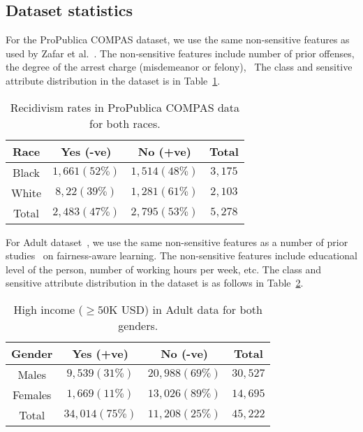\documentclass{article}
\begin{document}
\begin{appendix}
\section{Dataset statistics} \label{app:data}



For the ProPublica COMPAS dataset, we use the same non-sensitive features as used by Zafar et al.~\cite{zafar_dmt}. The non-sensitive features include number of prior offenses, the degree of the arrest charge (misdemeanor or felony), \etc~The class and sensitive attribute distribution in the dataset is  in Table~\ref{table:compas-stats}.

\begin{table}[h]
\centering
\caption{Recidivism rates in ProPublica COMPAS data for both races.} \label{table:compas-stats}
\begin{tabular}{cccc}
\hline
Race  &  Yes (-ve)       & No (+ve)       & Total \\ \hline
Black &  $ 1,661 (52\%)  $ & $ 1,514 (48\%)$ &  $ 3,175$ \\
White &  $ 8,22  (39\%) $  & $1,281  (61\%)$ &  $ 2,103$ \\ \hline
Total &  $ 2,483 (47\%) $  & $2,795  (53\%)$ &  $ 5,278$ \\ \hline
\end{tabular}
\end{table}



For Adult dataset~\cite{adult_dataset}, we use the same non-sensitive features as a number of prior studies~\cite{feldman_kdd15,zafar_fairness,icml2013_zemel13} on fairness-aware  learning. The non-sensitive features include educational level of the person, number of working hours per week, etc.
The class and sensitive attribute distribution in the dataset is as follows in Table~\ref{table:adult-stats}.

\begin{table}[h]
\centering
\caption{High income ($\geq 50$K USD) in Adult data for both genders.} \label{table:adult-stats}
\begin{tabular}{cccc}
\hline
Gender  & Yes (+ve) & No (-ve) & Total \\ \hline
Males &  $ 9{,}539 (31\%)$&  $ 20{,}988 (69\%)$   &  $ 30{,}527$\\
Females & $1{,}669 (11\%)$&  $ 13{,}026 (89\%)$   &  $14,695 $\\ \hline
Total & $34{,}014 (75\%)$ &  $11{,}208 (25\%)$
&  $ 45{,}222$ \\\hline
\end{tabular}
\end{table}




\end{appendix}
\end{document}
